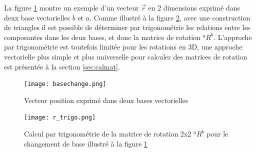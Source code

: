 La figure \ref{fig:basechange2d} montre un exemple d'un vecteur $\vec{r}$ en 2 dimensions exprimé dans deux base vectorielles $b$ et $a$. Comme illustré à la figure \ref{fig:r_trigo}, avec une construction de triangles il est possible de déterminer par trigonométrie les relations entre les composantes dans les deux bases, et donc la matrice de rotation ${}^aR^b$. L'approche par trigonométrie est toutefois limitée pour les rotations en 3D, une approche vectorielle plus simple et plus universelle pour calculer des matrices de rotation est présentée à la section \ref{sec:calmat}.
\begin{figure}[htbp]
	\centering
		\texttt{[image: basechange.png]}
	\caption{Vecteur position exprimé dans deux bases vectorielles}
	\label{fig:basechange2d}
\end{figure}
\begin{figure}[hb]
	\centering
		\texttt{[image: r\_trigo.png]}
	\caption{Calcul par trigonométrie de la matrice de rotation 2x2 ${}^aR^b$ pour le changement de base illustré à la figure \ref{fig:basechange2d}}
	\label{fig:r_trigo}
\end{figure}


